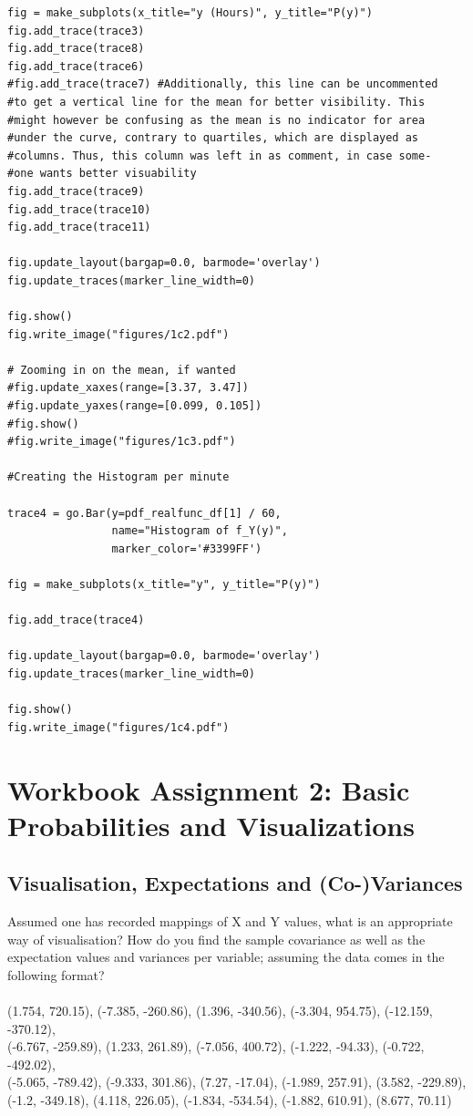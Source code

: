 \begin{verbatim}
fig = make_subplots(x_title="y (Hours)", y_title="P(y)")
fig.add_trace(trace3)
fig.add_trace(trace8)
fig.add_trace(trace6)
#fig.add_trace(trace7) #Additionally, this line can be uncommented
#to get a vertical line for the mean for better visibility. This
#might however be confusing as the mean is no indicator for area
#under the curve, contrary to quartiles, which are displayed as
#columns. Thus, this column was left in as comment, in case some-
#one wants better visuability
fig.add_trace(trace9)
fig.add_trace(trace10)
fig.add_trace(trace11)

fig.update_layout(bargap=0.0, barmode='overlay')
fig.update_traces(marker_line_width=0)

fig.show()
fig.write_image("figures/1c2.pdf")

# Zooming in on the mean, if wanted
#fig.update_xaxes(range=[3.37, 3.47])
#fig.update_yaxes(range=[0.099, 0.105])
#fig.show()
#fig.write_image("figures/1c3.pdf")

#Creating the Histogram per minute

trace4 = go.Bar(y=pdf_realfunc_df[1] / 60,
                name="Histogram of f_Y(y)",
                marker_color='#3399FF')

fig = make_subplots(x_title="y", y_title="P(y)")

fig.add_trace(trace4)

fig.update_layout(bargap=0.0, barmode='overlay')
fig.update_traces(marker_line_width=0)

fig.show()
fig.write_image("figures/1c4.pdf")
\end{verbatim}

\chapter{Workbook Assignment 2: Basic Probabilities and Visualizations }	

\section{Visualisation, Expectations and (Co-)Variances}
Assumed one has recorded mappings of X and Y values, what is an appropriate way of visualisation? How do you find the sample covariance as well as the expectation values and variances per variable; assuming the data comes in the following format?\\
\\
(1.754, 720.15), (-7.385, -260.86), (1.396, -340.56), (-3.304, 954.75), 
(-12.159, -370.12),\\ (-6.767, -259.89), (1.233, 261.89), (-7.056, 400.72), 
(-1.222, -94.33), (-0.722, -492.02),\\ (-5.065, -789.42), (-9.333, 301.86), 
(7.27, -17.04), (-1.989, 257.91), (3.582, -229.89), \\(-1.2, -349.18), 
(4.118, 226.05), (-1.834, -534.54), (-1.882, 610.91), (8.677, 70.11) \\

